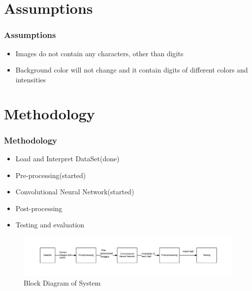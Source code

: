 \documentclass[11.5pt,aspectratio=1610,xcolor={usenames,dvipsnames,table}]{beamer}
\begin{document}
\section{Assumptions}
\begin{frame}
\frametitle{Assumptions}
\begin{itemize}
	\item Images do not contain any characters, other than digits
	\item Background color will not change and it contain digits of different colors and intensities 

\end{itemize}
\end{frame}



\section{Methodology}
\begin{frame}

\frametitle{Methodology}

\begin{itemize}
	\item Load and Interpret DataSet(done)
	\item Pre-processing(started)
	\item Convolutional Neural Network(started)
	\item Post-processing
	\item Testing and evaluation
\end{itemize}
\begin{figure}[!h]
	\includegraphics[width=\textwidth ]{images/methodology.png}
	\caption{Block Diagram of System}
\end{figure}

\end{frame}
\end{document}
